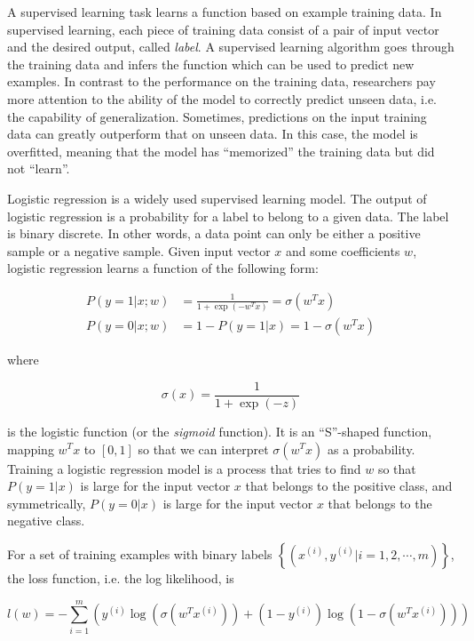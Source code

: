     A supervised learning task learns a function based on example training data.
    In supervised learning, each piece of training data consist of a pair of input vector
    and the desired output, called \emph{label}.
    A supervised learning algorithm goes through the training data and infers the function
    which can be used to predict new examples.
    In contrast to the performance on the training data,
    researchers pay more attention to the ability of the model to correctly predict unseen data,
    i.e. the capability of generalization.
    Sometimes, predictions on the input training data can greatly outperform that on unseen data.
    In this case, the model is overfitted, meaning that the model has ``memorized'' the training data
    but did not ``learn''.

    Logistic regression is a widely used supervised learning model.
    The output of logistic regression is a probability for a label to belong to a given data.
    The label is binary discrete.
    In other words, a data point can only be either a positive sample or a negative sample.
    Given input vector $x$ and some coefficients $w$,
    logistic regression learns a function of the following form:

    \begin{align*}
        P(y=1 | x;w) &= \frac{1}{1+\exp(-w^Tx)} = \sigma(w^Tx)\\
        P(y=0 | x;w) &= 1-P(y=1 | x) = 1-\sigma(w^Tx)
    \end{align*}

    where

    \[
    \sigma(x) = \frac{1}{1+\exp(-z)}
    \]

    is the logistic function (or the \emph{sigmoid} function).
    It is an ``S''-shaped function, mapping $w^Tx$ to $[0,1]$
    so that we can interpret $\sigma(w^Tx)$ as a probability.
    Training a logistic regression model is a process that tries to find $w$ so that
    $P(y=1 | x)$ is large for the input vector $x$ that belongs to the positive class,
    and symmetrically, $P(y=0 | x)$ is large for the input vector $x$ that belongs to the negative class.

    For a set of training examples with binary labels $\left\{ (x^{(i)}, y^{(i)} | i = 1, 2, \cdots, m) \right\}$,
    the loss function, i.e. the log likelihood, is

    \[
    l(w) = -\sum_{i=1}^m \left( y^{(i)}\log\left(\sigma(w^Tx^{(i)})\right) + (1-y^{(i)})\log\left(1-\sigma(w^Tx^{(i)})\right) \right)
    \]

